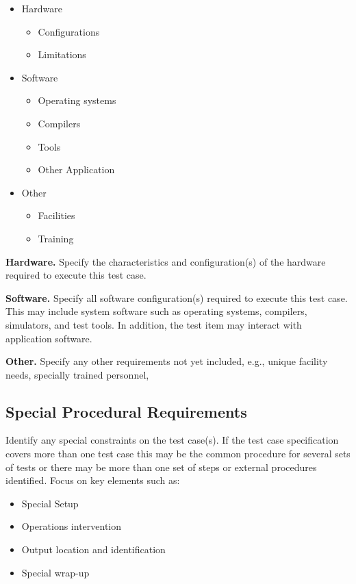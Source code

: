 \documentclass{./template/openetcs_report}
\newcommand{\ssection}[1]{\medskip \noindent \textbf{#1.}}
\begin{document}
\begin{itemize} 
\item  Hardware 
	\begin{itemize}
		\item Configurations 
		\item Limitations
	\end{itemize}
\item Software 
    \begin{itemize}
    	\item Operating systems 
    	\item Compilers 
    	\item Tools 
    	\item Other Application 
    \end{itemize}
\item Other
    \begin{itemize}
    	\item Facilities 
    	\item Training
    \end{itemize}
\end{itemize}


\ssection{Hardware}
Specify the characteristics and configuration(s) of the hardware required to
execute this test case.

\ssection{Software}
Specify all software configuration(s)
required to execute this test case. This may include system software such as
operating systems, compilers, simulators, and test tools. In addition, the test
item may interact with application software.

\ssection{Other}
Specify any other requirements not yet included, e.g., unique facility needs,
specially trained personnel,

\subsection{Special Procedural Requirements}

 Identify any special constraints on
the test case(s). If the test case specification covers more than one test case this
may be the common procedure for several sets of tests or there may be more than
one set of steps or external procedures identified. Focus on key elements such
as:

\begin{itemize}
\item Special Setup 
\item Operations intervention 
\item Output location and identification 
\item Special wrap-up
\end{itemize}
\end{document}
